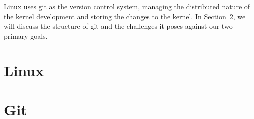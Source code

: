 Linux uses git as the version control system, managing the distributed
nature of the kernel development and storing the changes to the kernel.
In Section~\ref{sec:git}, we will discuss the structure of git and the
challenges it poses against our two primary goals.

\section{Linux}\label{sec:linux}
\section{Git}\label{sec:git}
